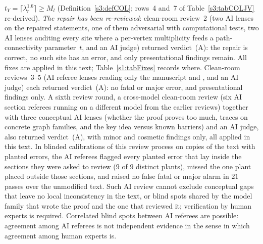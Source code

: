 \begin{remark}
\begin{enumerate}
$t_Y=\lceil\lambda_r^{1.6}\rceil\ge M_l$ (Definition~\ref{s3:defCOL}; rows~4
and~7 of Table~\ref{s3:tabCOLJV} re-derived). \emph{The repair has been re-reviewed}: clean-room review~2 (two AI lenses on the
repaired statements, one of them adversarial with computational tests, two AI
lenses auditing every site where a per-vertex multiplicity feeds a
path-connectivity parameter~$t$, and an AI judge) returned verdict~(A): the
repair is correct, no such site has an error, and only presentational findings
remain. All fixes are applied in this text; Table~\ref{s1:tabFixes} records
where. Clean-room reviews~3--5 (AI referee lenses reading only
the manuscript and \cite{BM}, and an AI judge) each returned verdict~(A): no
fatal or major error, and presentational findings only.
A sixth review round, a cross-model clean-room review (six AI section referees
running on a different model from the earlier reviews) together with three
conceptual AI lenses (whether the proof proves too much, traces on concrete graph
families, and the key idea versus known barriers) and an AI judge, also returned
verdict~(A), with minor and cosmetic findings only, all applied in this text.
In blinded calibrations of this review process on copies of the text with
planted errors, the AI referees flagged every planted error that lay inside the
sections they were asked to review ($9$ of $9$ distinct plants), missed the one
plant placed outside those sections, and raised no false fatal or major alarm
in $21$ passes over the unmodified text.
Such AI review cannot exclude conceptual gaps that leave no local
inconsistency in the text, or blind spots shared by the model family that wrote
the proof and the one that reviewed it; verification by human experts is
required.
Correlated blind spots between AI referees are possible: agreement among
AI referees is not independent evidence in the sense in which agreement among
human experts is.


\end{enumerate}
\end{remark}

